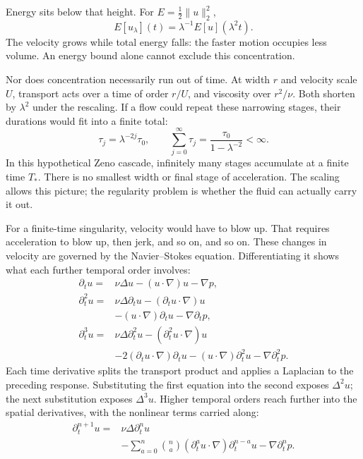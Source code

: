 Energy sits below that height. For \(E=\tfrac12\|u\|_2^2\),
\[
 E[u_\lambda](t)=\lambda^{-1}E[u](\lambda^2t).
\]
The velocity grows while total energy falls: the faster motion occupies
less volume. An energy bound alone cannot exclude this concentration.

Nor does concentration necessarily run out of time. At width \(r\) and
velocity scale \(U\), transport acts over a time of order \(r/U\), and
viscosity over \(r^2/\nu\). Both shorten by \(\lambda^2\) under the
rescaling. If a flow could repeat these narrowing stages, their durations
would fit into a finite total:
\[
 \tau_j=\lambda^{-2j}\tau_0,
 \qquad
 \sum_{j=0}^{\infty}\tau_j
 =\frac{\tau_0}{1-\lambda^{-2}}<\infty.
\]
In this hypothetical Zeno cascade, infinitely many stages accumulate at
a finite time \(T_*\). There is no smallest width or final stage of
acceleration. The scaling allows this picture; the regularity problem
is whether the fluid can actually carry it out.

For a finite-time singularity, velocity would have to blow up. That requires
acceleration to blow up, then jerk, and so on, and so on. These changes in
velocity are governed by the Navier--Stokes equation. Differentiating it
shows what each further temporal order involves:
\[
 \begin{aligned}
 \partial_tu={}&\nu\Delta u-(u\cdot\nabla)u-\nabla p,\\
 \partial_t^2u={}&\nu\Delta\partial_tu
 -(\partial_tu\cdot\nabla)u\\
 &-(u\cdot\nabla)\partial_tu-\nabla\partial_tp,\\
 \partial_t^3u={}&\nu\Delta\partial_t^2u
 -(\partial_t^2u\cdot\nabla)u\\
 &-2(\partial_tu\cdot\nabla)\partial_tu
 -(u\cdot\nabla)\partial_t^2u
 -\nabla\partial_t^2p.
 \end{aligned}
\]
Each time derivative splits the transport product and applies a Laplacian
to the preceding response. Substituting the first equation into the second
exposes \(\Delta^2u\); the next substitution exposes \(\Delta^3u\).
Higher temporal orders reach further into the spatial derivatives, with
the nonlinear terms carried along:
\[
 \begin{aligned}
 \partial_t^{n+1}u={}&\nu\Delta\partial_t^nu\\
 &-\sum_{a=0}^{n}\binom na
 (\partial_t^au\cdot\nabla)\partial_t^{n-a}u
 -\nabla\partial_t^np.
 \end{aligned}
\]

